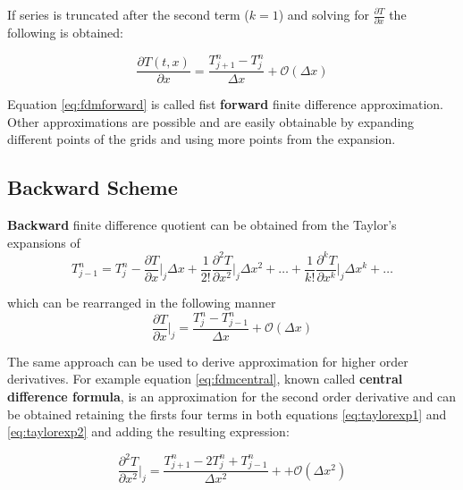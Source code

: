     If series is truncated after the second term ($k=1$) and solving for $\frac{\partial T}{\partial x}$ the following is obtained:
    
    \begin{equation}
    \frac{\partial T(t,x)}{\partial x}  = \frac{T^n_{j+1} - T^n_{j}}{\Delta x} + \mathcal{O}(\Delta x)
    \label{eq:fdmforward}
    \end{equation}
    
    Equation \ref{eq:fdmforward} is called fist \textbf{forward} finite difference approximation. Other approximations are possible and are easily obtainable by expanding different points of the grids and using more points from the expansion.
    
  \subsection{Backward Scheme}  
    \textbf{Backward} finite difference quotient can be obtained from the Taylor's expansions of    
        \begin{equation}
    T^n_{j-1} = T^n_{j} - 
    \frac{\partial T}{\partial x}\bigg\rvert_j \Delta x +
    \frac{1}{2!}  \frac{\partial^2 T}{\partial x^2}\bigg\rvert_j \Delta x^2 + \ldots + 
     \frac{1}{k!}  \frac{\partial^k T}{\partial x^k}\bigg\rvert_j \Delta x^k + \ldots
     \label{eq:taylorexp2}
    \end{equation}
    
    which can be rearranged in the following manner
        \begin{equation}
    \frac{\partial T}{\partial x}\bigg\rvert_j  = \frac{T^n_{j} - T^n_{j-1}}{\Delta x} + \mathcal{O}(\Delta x)
    \label{eq:fdmfbackward}
    \end{equation}
    
   The same approach can be used to derive approximation for higher order derivatives.
   For example equation \ref{eq:fdmcentral}, known called \textbf{central difference formula}, is an approximation for the second order derivative and can be obtained retaining the firsts four terms in both equations \ref{eq:taylorexp1} and \ref{eq:taylorexp2} and adding the resulting expression:
   
    \begin{equation}
		\frac{\partial^2 T}{\partial x^2}\bigg\rvert_j = \frac{T^n_{j+1}- 2T^n_{j} + T^n_{j-1}}{\Delta x^2} + + \mathcal{O}(\Delta x^2)
		\label{eq:fdmcentral}
    \end{equation}
    
